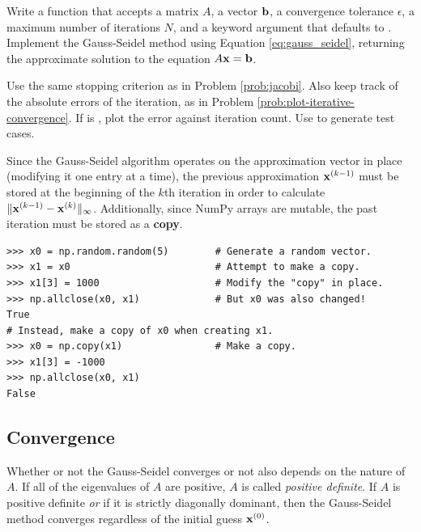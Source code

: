 \begin{problem} %
Write a function that accepts a matrix $A$, a vector $\mathbf{b}$, a convergence tolerance $\epsilon$, a maximum number of iterations $N$, and a keyword argument  that defaults to .
Implement the Gauss-Seidel method using Equation \ref{eq:gauss_seidel}, returning the approximate solution to the equation $A\mathbf{x} = \mathbf{b}$.

Use the same stopping criterion as in Problem \ref{prob:jacobi}.
Also keep track of the absolute errors of the iteration, as in Problem \ref{prob:plot-iterative-convergence}.
If  is , plot the error against iteration count.
Use  to generate test cases.

\begin{warn}
Since the Gauss-Seidel algorithm operates on the approximation vector in place (modifying it one entry at a time), the previous approximation $\mathbf{x}^{(k-1)}$ must be stored at the beginning of the $k$th iteration in order to calculate $\|\mathbf{x}^{(k-1)} - \mathbf{x}^{(k)}\|_\infty$.
Additionally, since NumPy arrays are mutable, the past iteration must be stored as a \textbf{copy}.

\begin{lstlisting}
>>> x0 = np.random.random(5)        # Generate a random vector.
>>> x1 = x0                         # Attempt to make a copy.
>>> x1[3] = 1000                    # Modify the "copy" in place.
>>> np.allclose(x0, x1)             # But x0 was also changed!
True
# Instead, make a copy of x0 when creating x1.
>>> x0 = np.copy(x1)                # Make a copy.
>>> x1[3] = -1000
>>> np.allclose(x0, x1)
False
\end{lstlisting}
\end{warn}

\label{prob:gauss_seidel}
\end{problem}

\subsection*{Convergence} %

Whether or not the Gauss-Seidel converges or not also depends on the nature of $A$.
If all of the eigenvalues of $A$ are positive, $A$ is called \emph{positive definite}.
If $A$ is positive definite \emph{or} if it is strictly diagonally dominant, then the Gauss-Seidel method converges regardless of the initial guess $\mathbf{x}^{(0)}$.

